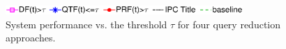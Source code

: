 %
%
\begin{figure}[t!]
\begin{centering}
\includegraphics[width=9cm]{imgs/l2.eps}
\par\end{centering}
\begin{centering}
\par\end{centering}

\protect\caption{System performance vs. the threshold $\tau$ for four query reduction approaches.}
\label{fig:queryreduc}
\end{figure}
